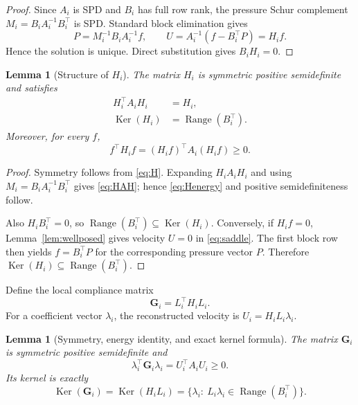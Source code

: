 \documentclass[11pt,a4paper]{article}
\newtheorem{lemma}[assumption]{Lemma}
\newcommand{\DtN}{\mathbf G}
\newcommand{\Range}{\operatorname{Range}}
\newcommand{\Ker}{\operatorname{Ker}}
\begin{document}
\begin{proof}
Since $A_i$ is SPD and $B_i$ has full row rank, the pressure Schur complement
$M_i=B_iA_i^{-1}B_i^\top$ is SPD.  Standard block elimination gives
\[
 P=M_i^{-1}B_iA_i^{-1}f,
 \qquad
 U=A_i^{-1}(f-B_i^\top P)=H_if.
\]
Hence the solution is unique.  Direct substitution gives $B_iH_i=0$.
\end{proof}

\begin{lemma}[Structure of $H_i$]\label{lem:H}
The matrix $H_i$ is symmetric positive semidefinite and satisfies
\begin{align}
 H_i^\top A_iH_i&=H_i,\label{eq:HAH}\\
 \Ker(H_i)&=\Range(B_i^\top).\label{eq:kerH}
\end{align}
Moreover, for every $f$,
\begin{equation}\label{eq:Henergy}
 f^\top H_if=(H_if)^\top A_i(H_if)\ge0.
\end{equation}
\end{lemma}

\begin{proof}
Symmetry follows from \eqref{eq:H}.  Expanding $H_iA_iH_i$ and using
$M_i=B_iA_i^{-1}B_i^\top$ gives \eqref{eq:HAH}; hence
\eqref{eq:Henergy} and positive semidefiniteness follow.

Also $H_iB_i^\top=0$, so $\Range(B_i^\top)\subseteq\Ker(H_i)$.  Conversely,
if $H_if=0$, Lemma~\ref{lem:wellposed} gives velocity $U=0$ in
\eqref{eq:saddle}.  The first block row then yields $f=B_i^\top P$ for the
corresponding pressure vector $P$.  Therefore
$\Ker(H_i)\subseteq\Range(B_i^\top)$.
\end{proof}

Define the local compliance matrix
\begin{equation}\label{eq:G}
 \DtN_i=L_i^\top H_iL_i.
\end{equation}
For a coefficient vector $\lambda_i$, the reconstructed velocity is
$U_i=H_iL_i\lambda_i$.

\begin{lemma}[Symmetry, energy identity, and exact kernel formula]
\label{lem:G}
The matrix $\DtN_i$ is symmetric positive semidefinite and
\begin{equation}\label{eq:Genergy}
 \lambda_i^\top\DtN_i\lambda_i=U_i^\top A_iU_i\ge0.
\end{equation}
Its kernel is exactly
\begin{equation}\label{eq:Gkernel-general}
 \Ker(\DtN_i)=\Ker(H_iL_i)
 =\{\lambda_i:\ L_i\lambda_i\in\Range(B_i^\top)\}.
\end{equation}
\end{lemma}
\end{document}
